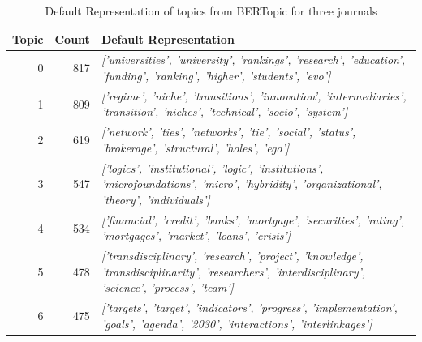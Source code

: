 \documentclass[12pt]{article}
\begin{document}
\begin{landscape}
\begin{table}[]
\small
\centering
\caption{Default Representation of topics from BERTopic for three journals}
\label{tab:default_rep_3j}
\begin{tabular}{|r|r|l|}
\hline
\multicolumn{1}{|l|}{\textbf{Topic}} & \multicolumn{1}{l|}{\textbf{Count}} & \textbf{Default Representation}                                                                                                                                         \\ \hline
0                                    & 817                                 & \textit{{[}'universities', 'university', 'rankings', 'research', 'education', 'funding', 'ranking', 'higher', 'students', 'evo'{]}}                             \\ \hline
1                                    & 809                                 & \textit{{[}'regime', 'niche', 'transitions', 'innovation', 'intermediaries', 'transition', 'niches', 'technical', 'socio', 'system'{]}}                         \\ \hline
2                                    & 619                                 & \textit{{[}'network', 'ties', 'networks', 'tie', 'social', 'status', 'brokerage', 'structural', 'holes', 'ego'{]}}                                              \\ \hline
3                                    & 547                                 & \textit{{[}'logics', 'institutional', 'logic', 'institutions', 'microfoundations', 'micro', 'hybridity', 'organizational', 'theory', 'individuals'{]}}          \\ \hline
4                                    & 534                                 & \textit{{[}'financial', 'credit', 'banks', 'mortgage', 'securities', 'rating', 'mortgages', 'market', 'loans', 'crisis'{]}}                                     \\ \hline
5                                    & 478                                 & \textit{{[}'transdisciplinary', 'research', 'project', 'knowledge', 'transdisciplinarity', 'researchers', 'interdisciplinary', 'science', 'process', 'team'{]}} \\ \hline
6                                    & 475                                 & \textit{{[}'targets', 'target', 'indicators', 'progress', 'implementation', 'goals', 'agenda', '2030', 'interactions', 'interlinkages'{]}}                      \\ \hline

\end{tabular}
\end{table}
\end{landscape}
\end{document}
